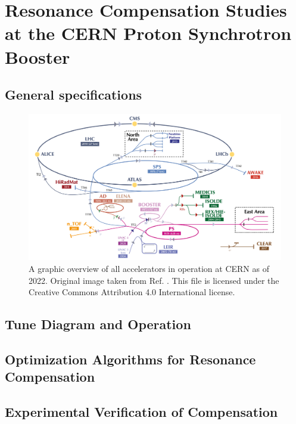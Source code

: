 \chapter{Resonance Compensation Studies at the CERN Proton Synchrotron Booster}
\label{sec:ch5}

\section{General specifications}

\begin{figure}[H]
    \centering
    \includegraphics[width=\linewidth]{chapter5/CERN_AC.png}
    \caption{A graphic overview of all accelerators in operation at CERN as of 2022. Original image taken from Ref. \cite{cernplot}. This file is licensed under the Creative Commons Attribution 4.0 International license.}
    \label{fig:cernac}
 \end{figure}

\section{Tune Diagram and Operation}

\section{Optimization Algorithms for Resonance Compensation}

\section{Experimental Verification of Compensation}
